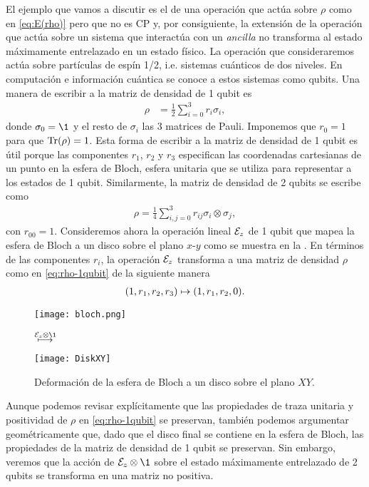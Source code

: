 El ejemplo que vamos a discutir es el de una operación que actúa 
sobre $\rho$ como en \eqref{eq:E(rho)}  
pero que no es CP y, por consiguiente,
la extensión de la operación que actúa sobre un sistema que interactúa con un 
\textit{ancilla} no transforma al estado máximamente entrelazado en 
un estado físico. La operación que consideraremos 
actúa sobre partículas de espín 1/2, i.e. sistemas cuánticos de
dos niveles. En computación e información cuántica
se conoce a estos sistemas como qubits. Una manera
de escribir a la matriz de densidad de 1 qubit es
\begin{align}
\rho&=\frac{1}{2}\sum_{i=0}^{3} r_i\sigma_i,
\label{eq:rho-1qubit}
\end{align}
donde $\sigma_0=\1$ y el resto de $\sigma_i$ las 3 matrices de Pauli.
Imponemos que $r_0=1$ para que $\Tr(\rho)=1$.
Esta forma de escribir a la matriz de densidad de 1 qubit es útil porque
las componentes $r_1$, $r_2$ y $r_3$ especifican las coordenadas 
cartesianas de un punto en la esfera de Bloch, esfera unitaria que 
se utiliza para representar a los estados de 1 qubit. Similarmente, 
la matriz de densidad de 2 qubits se escribe como~\cite{nielsen_chuang_2011}
\begin{align}\label{eq:rho-2qubits}
\rho=\frac{1}{4}\sum _{i,j=0}^{3}r_{ij}\sigma_i\otimes\sigma_j,
\end{align}
con $r_{00}=1$.
Consideremos ahora la operación lineal $\mathcal{E}_z$ de 1 qubit
que mapea la esfera de Bloch a un disco sobre el plano $x$-$y$ 
como se muestra en la .
En términos de las componentes $r_i$, la operación $\mathcal{E}_z$ 
transforma a una matriz de densidad $\rho$ como en 
\eqref{eq:rho-1qubit} de la siguiente manera
\begin{align}
\qty(1,r_1,r_2,r_3)\mapsto\qty(1,r_1,r_2,0).
\end{align}
\begin{figure}%
\centering
\begin{minipage}{.4\textwidth}
\centering
\texttt{[image: bloch.png]}
\end{minipage}
$\stackrel{\E_{z}\otimes\1 \vspace{1cm}}{\longmapsto}$
\begin{minipage}{0.4\textwidth}
\centering
\texttt{[image: DiskXY]}
\end{minipage}
\caption{
Deformación de la esfera de Bloch a un disco sobre el plano $XY$.}
\label{fig:qtm-op-motivation}
\end{figure} %
Aunque podemos revisar explícitamente que las propiedades 
de traza unitaria y positividad de $\rho$ en \eqref{eq:rho-1qubit}
se preservan, también podemos argumentar geométricamente
que, dado que el disco final se contiene en la esfera de Bloch, 
las propiedades de la matriz de densidad de 1 qubit se preservan.
Sin embargo, veremos que la acción de $\E_z\ot \1$ 
sobre el estado máximamente entrelazado de 2 qubits 
se transforma en una matriz no positiva.


